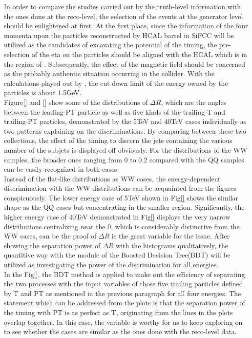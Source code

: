 In order to compare the studies carried out by the truth-level information with the ones done at the reco-level, the selection of the events at the generator level should be enlightened at first. At the first place, since the information of the four momenta upon the particles reconstructed by HCAL barrel in SiFCC will be utilized as the candidates of excavating the potential of the timing, the pre-selection of the eta on the particles should be aligned with the HCAL which is in the region of . Subsequently, the effect of the magnetic field should be concerned as the probably authentic situation occurring in the collider. With the calculations played out by , the cut down limit of the energy owned by the particles is about 1.5GeV.\\     

Figure\ref{} and \ref{} show some of the distributions of $\Delta R$, which are the angles between the leading-PT particle as well as five kinds of the trailing-T and trailing-PT particles, demonstrated by the 5TeV and 40TeV cases individually as two patterns explaining on the discriminations. By comparing between these two collections, the effect of the timing to discern the jets containing the various number of the subjets is displayed off obviously. For the distributions of the WW samples, the broader ones ranging from 0 to 0.2 compared with the QQ samples can be easily recognized in both cases.\\

Instead of the flat-like distributions as WW cases, the energy-dependent discrimination with the WW distributions can be acquainted from the figures conspicuously. The lower energy case of 5TeV shown in Fig\ref{} shows the similar shape as the QQ cases but concentrating in the smaller region. Significantly, the higher energy case of 40TeV demonstrated in Fig\ref{} displays the very narrow distributions centralizing near the 0, which is considerably distinctive from the WW cases, can be the proof of $\Delta R$ is the great variable for the issue. After showing the separation power of $\Delta R$ with the histograms qualitatively, the quantitive way with the module of the Boosted Decision Tree(BDT) will be utilized as investigating the power of the discrimination for all energies.\\

In the Fig\ref{}, the BDT method is applied to make out the efficiency of separating the two processes with the input variables of those five trailing particles defined by T and PT as mentioned in the previous paragraph for all four energies. The statement which can be addressed from the plots is that the separation power of the timing with PT is as perfect as T, originating from the lines in the plots overlap together. In this case, the variable is worthy for us to keep exploring on to see whether the cases are similar as the ones done with the reco-level data.\\

